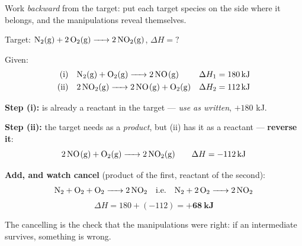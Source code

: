 \documentclass{apchem-worksheet}
\begin{document}
Work \emph{backward} from the target: put each target species on the side
where it belongs, and the manipulations reveal themselves.

\begin{workedexample}
Target: $\ce{N2(g) + 2O2(g) -> 2NO2(g)}$, $\Delta H = ?$

Given:
\begin{align*}
  \text{(i)}\quad & \ce{N2(g) + O2(g) -> 2NO(g)}
    & \Delta H_1 &= \SI{+180}{\kilo\joule}\\
  \text{(ii)}\quad & \ce{2NO2(g) -> 2NO(g) + O2(g)}
    & \Delta H_2 &= \SI{+112}{\kilo\joule}
\end{align*}

\textbf{Step (i):}  is already a reactant in the target ---
\emph{use as written}, $+180$ kJ.

\textbf{Step (ii):} the target needs  as a \emph{product}, but
(ii) has it as a reactant --- \textbf{reverse it}:
\[ \ce{2NO(g) + O2(g) -> 2NO2(g)} \qquad \Delta H = \SI{-112}{\kilo\joule} \]

\textbf{Add, and watch  cancel} (product of the first, reactant
of the second):
\[ \ce{N2 + O2 + O2 -> 2NO2} \quad\text{i.e.}\quad
   \ce{N2 + 2O2 -> 2NO2} \]
\[ \Delta H = 180 + (-112) = \mathbf{+68~kJ} \]

The  cancelling is the check that the manipulations were right:
if an intermediate survives, something is wrong.
\end{workedexample}
\end{document}

